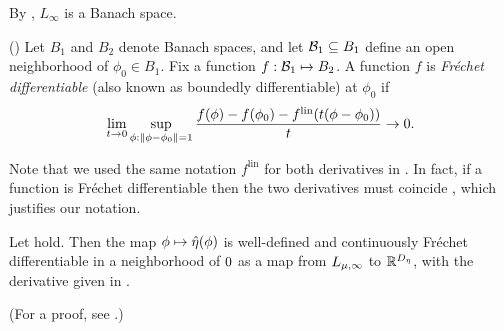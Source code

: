 

By \citep[Theorem 5.2.1]{dudley:2018:real}, $L_\infty$ is a Banach space.

\begin{defn}
    (\citep[Definition 4.5]{zeidler:2013:functional})
%
Let $B_1$ and $B_2$ denote Banach spaces, and let $\mathcal{B}_1 \subseteq B_1$ define
an open neighborhood of $\phi_0 \in B_1$.  Fix a function $f: \mathcal{B}_1
\mapsto B_2$.
%
A function $f$ is {\em Fr{\'echet} differentiable} (also known as boundedly
differentiable) at $\phi_0$ if
%
\begin{align*}
%
\lim_{t \rightarrow 0}
    \sup_{\phi: \norm{\phi - \phi_0} = 1}
    \frac{f(\phi) - f(\phi_0) -
          f^{\mathrm{lin}}(t (\phi - \phi_0))
         }{t} \rightarrow 0.
%
\end{align*}
%
\end{defn}

Note that we used the same notation $f^{\mathrm{lin}}$ for both derivatives in
.  In fact, if a function is Fr{\'e}chet differentiable
then the two derivatives must coincide \citep[Proposition
4.8]{zeidler:2013:functional}, which justifies our notation.


\begin{thm}
%
Let  hold. Then the map $\phi \mapsto
\hat\eta(\phi)$ is well-defined and continuously Fr{\'e}chet differentiable in a
neighborhood of $0$ as a map from ${L_{\mu,\infty}}$ to $\mathbb{R}^{D_{\eta}}$,
with the derivative given in .

(For a proof, see  .)

\end{thm}
